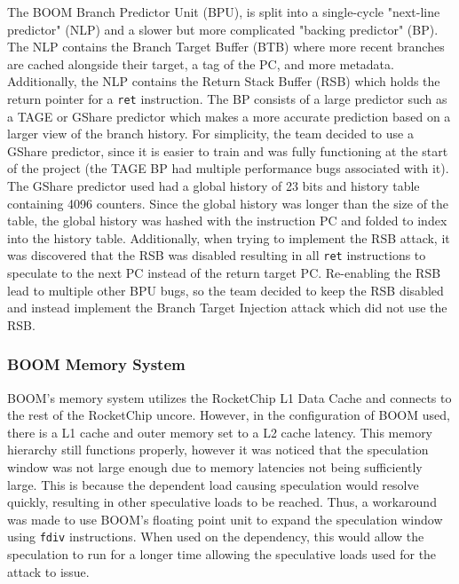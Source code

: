 The BOOM Branch Predictor Unit (BPU), is split into a single-cycle "next-line predictor" (NLP) and a
slower but more complicated "backing predictor" (BP). The NLP contains the Branch Target Buffer (BTB) 
where more recent branches are cached alongside their target, a tag of the PC, and more metadata. Additionally,
the NLP contains the Return Stack Buffer (RSB) which holds the return pointer for a {\tt ret} instruction. The BP
consists of a large predictor such as a TAGE or GShare predictor which makes a more accurate prediction based on
a larger view of the branch history. For simplicity, the team decided to use a GShare predictor, since it is 
easier to train and was fully functioning at the start of the project (the TAGE BP had multiple performance bugs
associated with it). The GShare predictor used had a global history of 23 bits and history table containing
4096 counters. Since the global history was longer than the size of the table, the global history was hashed with
the instruction PC and folded to index into the history table. Additionally, when trying to
implement the RSB attack, it was discovered that the RSB was disabled resulting in all {\tt ret} instructions
to speculate to the next PC instead of the return target PC. Re-enabling the RSB lead to multiple other BPU bugs,
so the team decided to keep the RSB disabled and instead implement the Branch Target Injection attack which did not
use the RSB.

\subsubsection{BOOM Memory System}


BOOM's memory system utilizes the RocketChip L1 Data Cache and connects to the rest of the RocketChip
uncore. However, in the configuration of BOOM used, there is a L1 cache and outer memory set to a L2 cache
latency. This memory hierarchy still functions properly, however it was noticed that the speculation window
was not large enough due to memory latencies not being sufficiently large. This is because the
dependent load causing speculation would resolve quickly, resulting in other speculative loads to be reached.
Thus, a workaround was made to use BOOM's floating point unit to expand the speculation 
window using {\tt fdiv} instructions. When used on the dependency, this would allow the speculation
to run for a longer time allowing the speculative loads used for the attack to issue.

